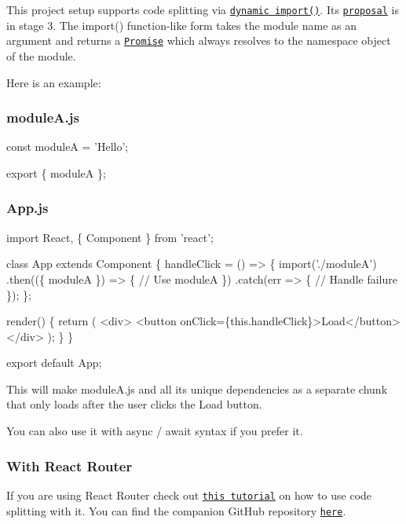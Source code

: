 This project setup supports code splitting via \href{http://2ality.com/2017/01/import-operator.html#loading-code-on-demand}{\tt dynamic {\ttfamily import()}}. Its \href{https://github.com/tc39/proposal-dynamic-import}{\tt proposal} is in stage 3. The {\ttfamily import()} function-\/like form takes the module name as an argument and returns a \href{https://developer.mozilla.org/en-US/docs/Web/JavaScript/Reference/Global_Objects/Promise}{\tt {\ttfamily Promise}} which always resolves to the namespace object of the module.

Here is an example\+:

\subsubsection*{{\ttfamily module\+A.\+js}}


\begin{DoxyCode}
const moduleA = 'Hello';

export \{ moduleA \};
\end{DoxyCode}
 \subsubsection*{{\ttfamily App.\+js}}


\begin{DoxyCode}
import React, \{ Component \} from 'react';

class App extends Component \{
  handleClick = () => \{
    import('./moduleA')
      .then((\{ moduleA \}) => \{
        // Use moduleA
      \})
      .catch(err => \{
        // Handle failure
      \});
  \};

  render() \{
    return (
      <div>
        <button onClick=\{this.handleClick\}>Load</button>
      </div>
    );
  \}
\}

export default App;
\end{DoxyCode}


This will make {\ttfamily module\+A.\+js} and all its unique dependencies as a separate chunk that only loads after the user clicks the \textquotesingle{}Load\textquotesingle{} button.

You can also use it with {\ttfamily async} / {\ttfamily await} syntax if you prefer it.

\subsubsection*{With React Router}

If you are using React Router check out \href{http://serverless-stack.com/chapters/code-splitting-in-create-react-app.html}{\tt this tutorial} on how to use code splitting with it. You can find the companion Git\+Hub repository \href{https://github.com/AnomalyInnovations/serverless-stack-demo-client/tree/code-splitting-in-create-react-app}{\tt here}.

